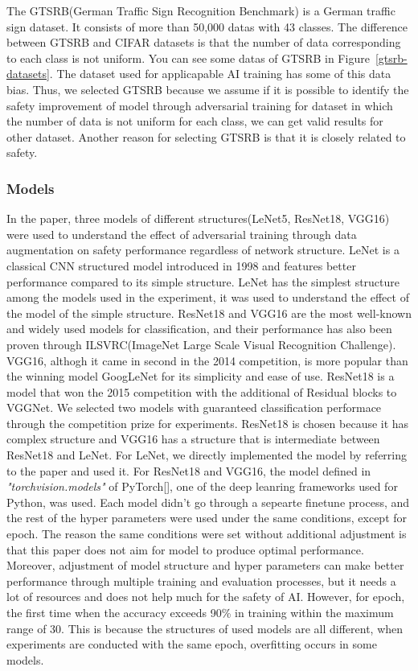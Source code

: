 \documentclass[journal,article,submit,moreauthors,pdftex]{Definitions/mdpi}
\begin{document}
The GTSRB(German Traffic Sign Recognition Benchmark) is a German traffic sign dataset. It consists of more than 50,000 datas with 43 classes.
The difference between GTSRB and CIFAR datasets is that the number of data corresponding to each class is not uniform.
You can see some datas of GTSRB in Figure~\ref{gtsrb-datasets}.
The dataset used for applicapable AI training has some of this data bias.
Thus, we selected GTSRB because we assume if it is possible to identify the safety improvement of model through adversarial training for dataset in which the number of data is not uniform for each class, we can get valid results for other dataset.
Another reason for selecting GTSRB is that it is closely related to safety.

\subsubsection{Models}

In the paper, three models of different structures(LeNet5, ResNet18, VGG16) were used to understand the effect of adversarial training through data augmentation on safety performance regardless of network structure.
LeNet is a classical CNN  structured model introduced in 1998 and features better performance compared to its simple structure.
LeNet has the simplest structure among the models used in the experiment, it was used to understand the effect of the model of the simple structure.
ResNet18 and VGG16 are the most well-known and widely used models for classification, and their performance has also been proven through ILSVRC(ImageNet Large Scale Visual Recognition Challenge).
VGG16, althogh it came in second in the 2014 competition, is more popular than the winning model GoogLeNet for its simplicity and ease of use.
ResNet18 is a model that won the 2015 competition with the additional of Residual blocks to VGGNet.
We selected two models with guaranteed classification performace through the competition prize for experiments.
ResNet18 is chosen because it has complex structure and VGG16 has a structure that is intermediate between ResNet18 and LeNet.
For LeNet, we directly implemented the model by referring to the paper and used it.
For ResNet18 and VGG16, the model defined in {\it "torchvision.models"} of PyTorch[], one of the deep leanring frameworks used for Python, was used.
Each model didn't go through a sepearte finetune process, and the rest of the hyper parameters were used under the same conditions, except for epoch.
The reason the same conditions were set without additional adjustment is that this paper does not aim for model to produce optimal performance.
Moreover, adjustment of model structure and hyper parameters can make better performance through multiple training and evaluation processes, but it needs a lot of resources and does not help much for the safety of AI.
However, for epoch, the first time when the accuracy exceeds 90\% in training within the maximum range of 30. This is because the structures of used models are all different, when experiments are conducted with the same epoch, overfitting occurs in some models.
\end{document}
